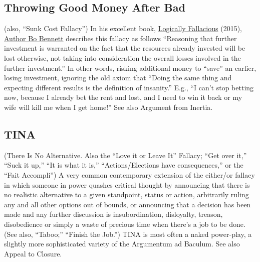 \documentclass[10pt,a4paper,british]{article}
\begin{document}
\begin{multicols}{2}
    \subsection{Throwing Good Money After Bad} (also, ``Sunk Cost Fallacy'') In his excellent book, \href{https://www.amazon.com/Logically-Fallacious-Ultimate-Collection-Fallacies/dp/1456624539/}{Logically Fallacious} (2015), \href{https://www.logicallyfallacious.com/tools/lp/Bo/LogicalFallacies/173/Sunk_Cost_Fallacy}{Author Bo Bennett} describes this fallacy as follows ``Reasoning that further investment is warranted on the fact that the resources already invested will be lost otherwise, not taking into consideration the overall losses involved in the further investment.''  In other words, risking additional money to ``save'' an earlier, losing investment, ignoring the old axiom that ``Doing the same thing and expecting different results is the definition of insanity.'' E.g., ``I can't stop betting now, because I already bet the rent and lost, and I need to win it back or my wife will kill me when I get home!'' See also Argument from Inertia.  

    \subsection{TINA} (There Is No Alternative. Also the ``Love it or Leave It'' Fallacy; ``Get over it,'' ``Suck it up,'' ``It is what it is,'' ``Actions/Elections have consequences,'' or the ``Fait Accompli'') A very common contemporary extension of the either/or fallacy in which someone in power quashes critical thought by announcing that there is no realistic alternative to a given standpoint, status or action, arbitrarily ruling any and all other options out of bounds, or announcing that a decision has been made and any further discussion is insubordination, disloyalty, treason, disobedience or simply a waste of precious time when there's a job to be done. (See also, ``Taboo;'' ``Finish the Job.'')  TINA is most often a naked power{-}play, a slightly more sophisticated variety of the Argumentum ad Baculum.  See also Appeal to Closure.  


\end{multicols}
\end{document}
